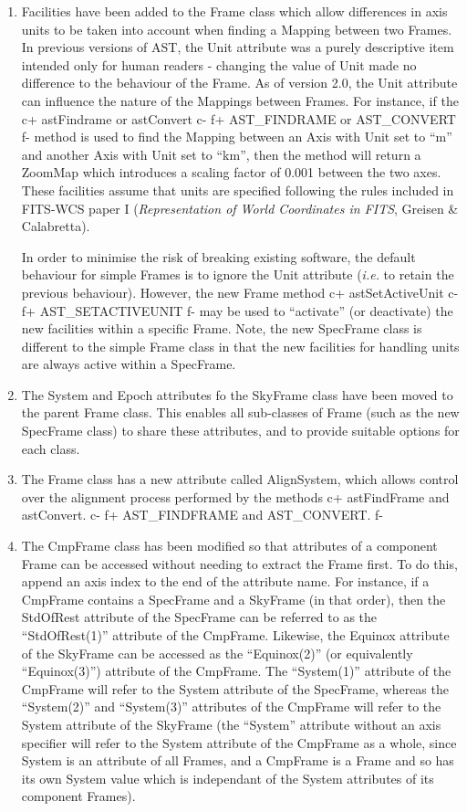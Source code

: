 \documentclass[twoside,11pt]{article}
\begin{document}
\begin{enumerate}
\item Facilities have been added to the Frame class which allow
differences in axis units to be taken into account when finding a Mapping
between two Frames. In previous versions of AST, the Unit attribute was a
purely descriptive item intended only for human readers - changing the
value of Unit made no difference to the behaviour of the Frame. As of
version 2.0, the Unit attribute can influence the nature of the Mappings
between Frames. For instance, if the
c+
astFindrame or astConvert
c-
f+
AST\_FINDRAME or AST\_CONVERT
f-
method is used to find the Mapping between an Axis with Unit set to ``m''
and another Axis with Unit set to ``km'', then the method will return a
ZoomMap which introduces a scaling factor of 0.001 between the two axes.
These facilities assume that units are specified following the rules
included in FITS-WCS paper I ({\em Representation of World
Coordinates in FITS}, Greisen \& Calabretta).

In order to minimise the risk of breaking existing software, the default
behaviour for simple Frames is to ignore the Unit attribute ({\em{i.e.}}
to retain the previous behaviour). However, the new Frame method
c+
astSetActiveUnit
c-
f+
AST\_SETACTIVEUNIT
f-
may be used to ``activate'' (or deactivate) the new facilities within a
specific Frame. Note, the new SpecFrame class is different to the simple
Frame class in that the new facilities for handling units are always active
within a SpecFrame.

\item The System and Epoch attributes fo the SkyFrame class have been
moved to the parent Frame class. This enables all sub-classes of Frame
(such as the new SpecFrame class) to share these attributes, and to provide
suitable options for each class.

\item The Frame class has a new attribute called AlignSystem, which allows
control over the alignment process performed by the methods
c+
astFindFrame and astConvert.
c-
f+
AST\_FINDFRAME and AST\_CONVERT.
f-


\item The CmpFrame class has been modified so that attributes of a
component Frame can be accessed without needing to extract the Frame first.
To do this, append an axis index to the end of the attribute name. For
instance, if a CmpFrame contains a SpecFrame and a SkyFrame (in that order),
then the StdOfRest attribute of the SpecFrame can be referred to as the
``StdOfRest(1)'' attribute of the CmpFrame. Likewise, the Equinox attribute
of the SkyFrame can be accessed as the ``Equinox(2)'' (or equivalently
``Equinox(3)'') attribute of the CmpFrame. The ``System(1)'' attribute of the
CmpFrame will refer to the System attribute of the SpecFrame, whereas the
``System(2)'' and ``System(3)'' attributes of the CmpFrame will refer to the
System attribute of the SkyFrame (the ``System'' attribute without an axis
specifier will refer to the System attribute of the CmpFrame as a whole,
since System is an attribute of all Frames, and a CmpFrame is a Frame and
so has its own System value which is independant of the System attributes
of its component Frames).


\end{enumerate}
\end{document}
